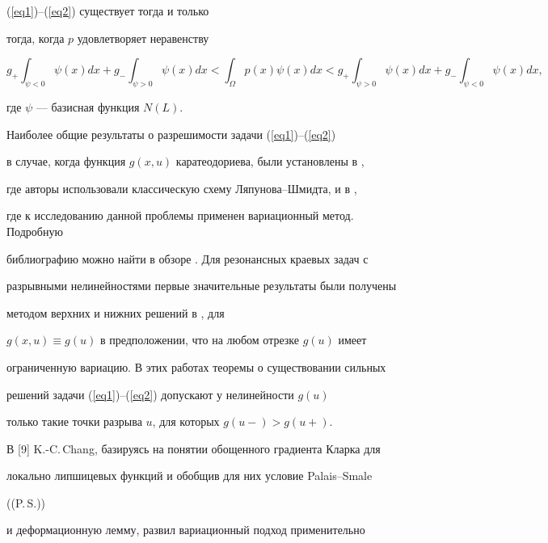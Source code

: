 (\ref{eq1})--(\ref{eq2}) существует тогда и только


тогда, когда $p$ удовлетворяет неравенству


$$




g_{+} \int_{ \psi <0} \psi (x)dx+g_{-}


\int_{ \psi>0} \psi (x)dx< \int_{ \Omega} p(x) \psi (x)


dx<g_{+} \int_{ \psi>0} \psi (x)dx+g_{-}


\int_{ \psi <0} \psi (x)dx,






$$


где $\psi$ --- базисная функция $N(L)$.





Наиболее общие результаты о разрешимости задачи (\ref{eq1})--(\ref{eq2})


в случае, когда функция $g(x,u)$ каратеодориева, были установлены в \cite{n4},


где авторы использовали классическую схему Ляпунова--Шмидта, и в \cite{n5},


где к исследованию данной проблемы применен вариационный метод. Подробную


библиографию можно найти в обзоре \cite{n6}. Для резонансных краевых задач с


разрывными нелинейностями первые значительные результаты были получены


методом верхних и нижних решений в \cite{n7}, \cite{n8} для


$g(x,u) \equiv g(u)$ в предположении, что на любом отрезке $g(u)$ имеет


ограниченную вариацию. В этих работах теоремы о существовании сильных


решений задачи (\ref{eq1})--(\ref{eq2}) допускают у нелинейности $g(u)$


только такие точки разрыва $u$, для которых $g(u-)>g(u+)$.


В [9] K.-C.\,Chang, базируясь на понятии обощенного градиента Кларка для


локально липшицевых функций и обобщив для них условие Palais--Smale


((P.\,S.))


и деформационную лемму, развил вариационный подход применительно


